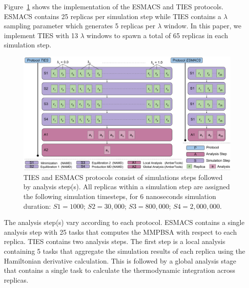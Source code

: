 Figure~\ref{fig:ties_esmacs_application} shows the implementation of the
ESMACS and TIES protocols. ESMACS contains 25 replicas per simulation step
while TIES contains a $\lambda$ sampling parameter which generates 5 replicas
per $\lambda$ window. In this paper, we implement TIES with 13 $\lambda$
windows to spawn a total of 65 replicas in each simulation step.

\begin{figure}
  \centering
  \includegraphics[width=\columnwidth]{figures/ties_esmacs_application_model.pdf}
  \captionsetup{singlelinecheck=off}
  \caption[]{TIES and ESMACS protocols consist of simulations steps followed
  by analysis step(s). All replicas within a simulation step are assigned the
  following simulation timesteps, for 6 nanoseconds simulation duration:
  $S1=1000$; $S2=30,000$; $S3=800,000$; $S4=2,000,000$.}
\label{fig:ties_esmacs_application}
\end{figure}

The analysis step(s) vary according to each protocol. ESMACS contains a
single analysis step with 25 tasks that computes the MMPBSA with respect to
each replica. TIES contains
two analysis steps. The first step is a local analysis containing 5 tasks
that aggregate the simulation results of each replica using the Hamiltonian
derivative calculation. This is followed by a global analysis stage that
contains a single task to calculate the thermodynamic integration across
replicas.


